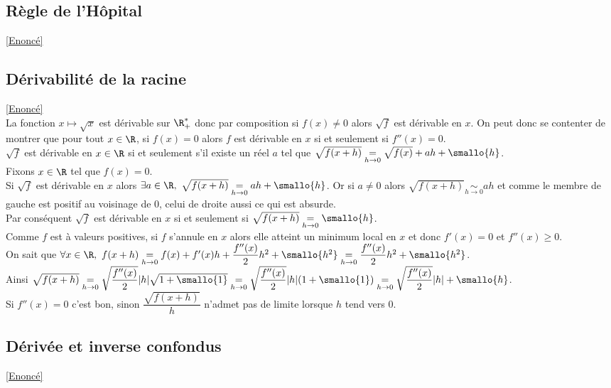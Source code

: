\documentclass{book}
\begin{document}
	\subsection{Règle de l'Hôpital}
	\label{Règle de l'Hôpital corrigé}
	\textcolor{blue}{\hyperref[Règle de l'Hôpital]{[Enoncé]}}\\
	
	\subsection{Dérivabilité de la racine }
	\label{Dérivabilité de la racine corrigé}
	\textcolor{blue}{\hyperref[Dérivabilité de la racine]{[Enoncé]}}\\
	La fonction $x\mapsto\sqrt x$ est dérivable sur $\R^*_+$ donc par composition si $f(x)\ne 0$ alors $\sqrt f$ est dérivable en $x$. On peut donc se contenter de montrer que pour tout $x\in \R$, si $f(x)=0$ alors $f$ est dérivable en $x$ si et seulement si $f''(x)=0$.\\
	$\sqrt f$ est dérivable en $x\in \R$ si et seulement s'il existe un réel $a$ tel que $\sqrt{f(x+h)}\underset{h\to 0}=\sqrt{f(x)}+ah+\smallo{h}$.\\
	Fixons $x\in \R$ tel que $f(x)=0$.\\
	Si $\sqrt f$ est dérivable en $x$ alors $\exists a\in \R,\ \sqrt{f(x+h)}\underset{h\to 0}=ah+\smallo{h}$. Or si $a\ne 0$ alors $\sqrt{f(x+h)}\underset{h\to 0}\sim ah$ et comme le membre de gauche est positif au voisinage de $0$, celui de droite aussi ce qui est absurde.\\
	Par conséquent $\sqrt f$ est dérivable en $x$ si et seulement si $\sqrt{f(x+h)}\underset{h\to 0}=\smallo{h}$.\\
	Comme $f$ est à valeurs positives, si $f$ s'annule en $x$ alors elle atteint un minimum local en $x$ et donc $f'(x)=0$ et $f''(x)\geq 0$.\\
	On sait que $\forall x\in \R,\ f(x+h)\underset{h\to 0}=f(x)+f'(x)h+\dfrac{f''(x)}{2}h^2+\smallo{h^2}\underset{h\to 0}=\dfrac{f''(x)}{2}h^2+\smallo{h^2}$.\\
	Ainsi $\sqrt{f(x+h)}\underset{h\to 0}=\sqrt{\dfrac{f''(x)}{2}}|h|\sqrt{1+\smallo{1}}\underset{h\to 0}=\sqrt{\dfrac{f''(x)}{2}}|h|(1+\smallo{1})\underset{h\to 0}=\sqrt{\dfrac{f''(x)}{2}}|h|+\smallo{h}$.\\
	Si $f''(x)=0$ c'est bon, sinon $\dfrac{\sqrt{f(x+h)}}{h}$ n'admet pas de limite lorsque $h$ tend vers $0$.
	
	\subsection{Dérivée et inverse confondus}
	\label{Dérivée et inverse confondus corrigé}
	\textcolor{blue}{\hyperref[Dérivée et inverse confondus]{[Enoncé]}}\\
	
\end{document}
